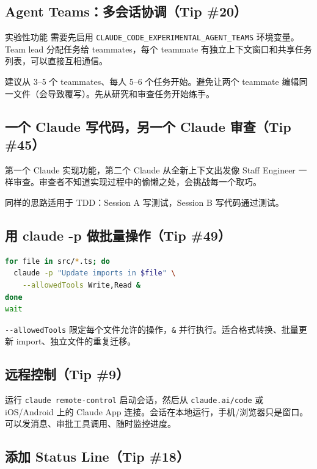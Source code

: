 \subsection{Agent Teams：多会话协调（Tip \#20）}

\begin{knowledgebox}{实验性功能}
需要先启用 \texttt{CLAUDE\_CODE\_EXPERIMENTAL\_AGENT\_TEAMS} 环境变量。Team lead 分配任务给 teammates，每个 teammate 有独立上下文窗口和共享任务列表，可以直接互相通信。

建议从 3--5 个 teammates、每人 5--6 个任务开始。避免让两个 teammate 编辑同一文件（会导致覆写）。先从研究和审查任务开始练手。
\end{knowledgebox}

\subsection{一个 Claude 写代码，另一个 Claude 审查（Tip \#45）}

第一个 Claude 实现功能，第二个 Claude 从全新上下文出发像 Staff Engineer 一样审查。审查者不知道实现过程中的偷懒之处，会挑战每一个取巧。

同样的思路适用于 TDD：Session A 写测试，Session B 写代码通过测试。

\subsection{用 claude -p 做批量操作（Tip \#49）}

\begin{lstlisting}[caption={批量操作示例}, language=bash]
for file in src/*.ts; do
  claude -p "Update imports in $file" \
    --allowedTools Write,Read &
done
wait
\end{lstlisting}

\texttt{-{}-allowedTools} 限定每个文件允许的操作，\texttt{\&} 并行执行。适合格式转换、批量更新 import、独立文件的重复迁移。

\subsection{远程控制（Tip \#9）}

运行 \texttt{claude remote-control} 启动会话，然后从 \texttt{claude.ai/code} 或 iOS/Android 上的 Claude App 连接。会话在本地运行，手机/浏览器只是窗口。可以发消息、审批工具调用、随时监控进度。

\subsection{添加 Status Line（Tip \#18）}

